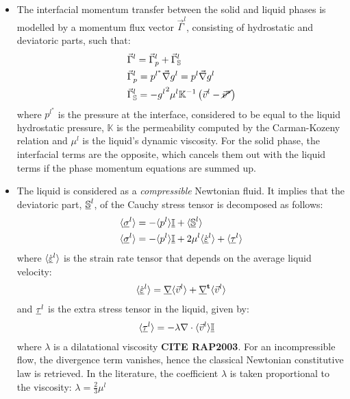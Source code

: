 \begin{itemize}
\item The interfacial momentum transfer between the solid and liquid phases is modelled 
by a momentum flux vector $\vec{\Gamma}^{l}$, consisting of hydrostatic and deviatoric 
parts, such that:
\begin{subequations}
\begin{align}
\label{eq:eq_interfacial_momentum_init}
		& \vec{\Gamma}^{l} =  \vec{\Gamma}_{p}^{l} + \vec{\Gamma}_{\mathbb{S}}^{l}						\\
		& \vec{\Gamma}_{p}^{l} = p^{l^{*}} \vec{\nabla} g^{l} = p^{l} \vec{\nabla} g^{l}			  \\
		& \vec{\Gamma}_{\mathbb{S}}^{l} = -{g^{l}}^{2} \mu^{l} \mathbb{K}^{-1} \left(  \vec{v}^l - \cancel{\vec{v}^s}  \right)  
\end{align}
\end{subequations}
where $p^{l^{*}}$ is the pressure at the interface, considered to be equal to the liquid hydrostatic 
pressure, $\mathbb{K}$ is the permeability computed by the Carman-Kozeny relation and $\mu^l$ is the 
liquid's dynamic viscosity.  For the solid phase, the interfacial terms are the opposite, which cancels 
them out with the liquid terms if the phase momentum equations are summed up.
\item The liquid is considered as a \emph{compressible} Newtonian fluid. It implies that the deviatoric part, $\underline{\mathbb{S}}^{l} $, of the Cauchy 
stress tensor is decomposed as follows: 
\begin{subequations} 
\begin{align}
\label{eq:stress_liq}
& \langle  \underline{\sigma}^{l}  \rangle = - \langle p^l \rangle \underline{\mathbb{I}} + \langle \underline{\mathbb{S}}^{l} \rangle   \\
& \langle  \underline{\sigma}^{l}  \rangle = - \langle p^l \rangle \underline{\mathbb{I}} + 2\mu^{l} \langle {\dot{\ensuremath{\underline{\varepsilon}}}}^l \rangle + \langle \underline{\tau}^l \rangle
\end{align}
\end{subequations}
where $ \langle {\dot{\ensuremath{\underline{\varepsilon}}}}^l \rangle $ is the strain rate tensor that depends on the average liquid velocity: 
\begin{align}
\label{eq:tensor_strainrate}
\langle {\dot{\ensuremath{\underline{\varepsilon}}}}^l \rangle = \underline{\nabla} \langle \vec{v}^l \rangle  +  \underline{\nabla}^\text{\textbf{t}} \langle \vec{v}^l \rangle 
\end{align}
and  $\underline{\tau}^{l}$ is the extra stress tensor in the liquid, given by:
\begin{subequations}
\begin{align}
\label{eq:tensor_extrastress}
 & \langle \underline{\tau}^l \rangle =  -\lambda \nabla \cdot \langle \vec{v}^l \rangle  \underline{\mathbb{I}} 
\end{align}
\end{subequations}
where $\lambda$ is a dilatational viscosity \textbf{CITE RAP2003}. For an incompressible flow, the divergence term vanishes, hence the classical Newtonian constitutive law is retrieved. In the literature, the coefficient $\lambda$ is taken proportional to the viscosity: $\lambda = \frac{2}{3} \mu^l $
\end{itemize}
